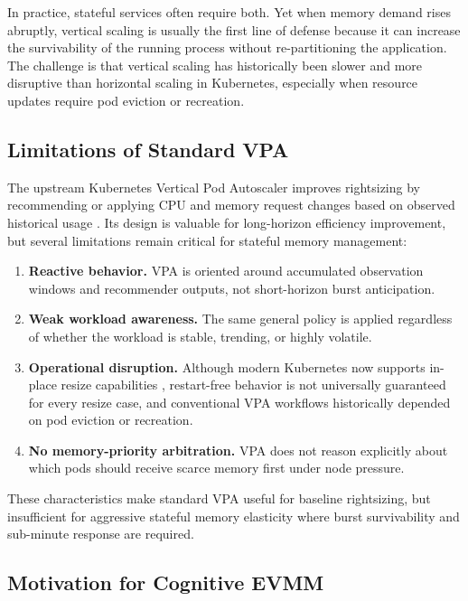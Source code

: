 \documentclass[12pt,a4paper]{article}
\begin{document}
In practice, stateful services often require both. Yet when memory demand rises abruptly, vertical scaling is usually the first line of defense because it can increase the survivability of the running process without re-partitioning the application. The challenge is that vertical scaling has historically been slower and more disruptive than horizontal scaling in Kubernetes, especially when resource updates require pod eviction or recreation.

\subsection{Limitations of Standard VPA}

The upstream Kubernetes Vertical Pod Autoscaler improves rightsizing by recommending or applying CPU and memory request changes based on observed historical usage \cite{vpa-repo}. Its design is valuable for long-horizon efficiency improvement, but several limitations remain critical for stateful memory management:
\begin{enumerate}[label=\arabic*)]
    \item \textbf{Reactive behavior.} VPA is oriented around accumulated observation windows and recommender outputs, not short-horizon burst anticipation.
    \item \textbf{Weak workload awareness.} The same general policy is applied regardless of whether the workload is stable, trending, or highly volatile.
    \item \textbf{Operational disruption.} Although modern Kubernetes now supports in-place resize capabilities \cite{k8s-resize,k8s-resize-blog}, restart-free behavior is not universally guaranteed for every resize case, and conventional VPA workflows historically depended on pod eviction or recreation.
    \item \textbf{No memory-priority arbitration.} VPA does not reason explicitly about which pods should receive scarce memory first under node pressure.
\end{enumerate}

These characteristics make standard VPA useful for baseline rightsizing, but insufficient for aggressive stateful memory elasticity where burst survivability and sub-minute response are required.

\subsection{Motivation for Cognitive EVMM}
\end{document}
